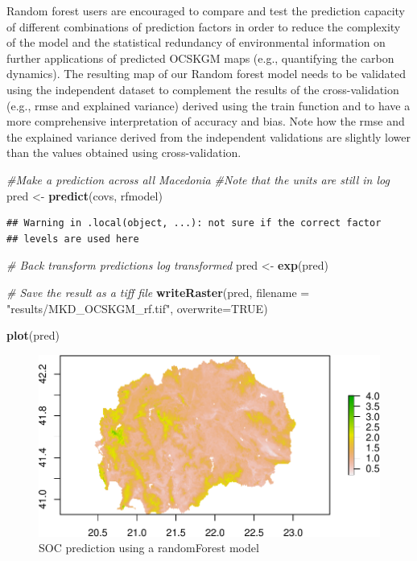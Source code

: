 \documentclass[10pt,b5paper,]{book}
\newenvironment{Shaded}{\begin{snugshade}}{\end{snugshade}}
\newcommand{\CommentTok}[1]{\textcolor[rgb]{0.56,0.35,0.01}{\textit{#1}}}
\newcommand{\DataTypeTok}[1]{\textcolor[rgb]{0.13,0.29,0.53}{#1}}
\newcommand{\KeywordTok}[1]{\textcolor[rgb]{0.13,0.29,0.53}{\textbf{#1}}}
\newcommand{\NormalTok}[1]{#1}
\newcommand{\OtherTok}[1]{\textcolor[rgb]{0.56,0.35,0.01}{#1}}
\newcommand{\StringTok}[1]{\textcolor[rgb]{0.31,0.60,0.02}{#1}}
\theoremstyle{definition}
\theoremstyle{definition}
\theoremstyle{definition}
\theoremstyle{remark}
\begin{document}
Random forest users are encouraged to compare and test the prediction
capacity of different combinations of prediction factors in order to
reduce the complexity of the model and the statistical redundancy of
environmental information on further applications of predicted OCSKGM
maps (e.g., quantifying the carbon dynamics). The resulting map of our
Random forest model needs to be validated using the independent dataset
to complement the results of the cross-validation (e.g., rmse and
explained variance) derived using the train function and to have a more
comprehensive interpretation of accuracy and bias. Note how the rmse and
the explained variance derived from the independent validations are
slightly lower than the values obtained using cross-validation.

\begin{Shaded}
\begin{Highlighting}[]
\CommentTok{#Make a prediction across all Macedonia}
\CommentTok{#Note that the units are still in log}
\NormalTok{pred <-}\StringTok{ }\KeywordTok{predict}\NormalTok{(covs, rfmodel)}
\end{Highlighting}
\end{Shaded}

\begin{verbatim}
## Warning in .local(object, ...): not sure if the correct factor
## levels are used here
\end{verbatim}

\begin{Shaded}
\begin{Highlighting}[]
\CommentTok{# Back transform predictions log transformed}
\NormalTok{pred <-}\StringTok{ }\KeywordTok{exp}\NormalTok{(pred)}

\CommentTok{# Save the result as a tiff file}
\KeywordTok{writeRaster}\NormalTok{(pred, }\DataTypeTok{filename =} \StringTok{"results/MKD_OCSKGM_rf.tif"}\NormalTok{,}
            \DataTypeTok{overwrite=}\OtherTok{TRUE}\NormalTok{)}


\KeywordTok{plot}\NormalTok{(pred)}
\end{Highlighting}
\end{Shaded}

\begin{figure}
\centering
\includegraphics{SOCMapping_files/figure-latex/rf-pred-1.pdf}
\caption{\label{fig:rf-pred}SOC prediction using a randomForest model}
\end{figure}
\end{document}
